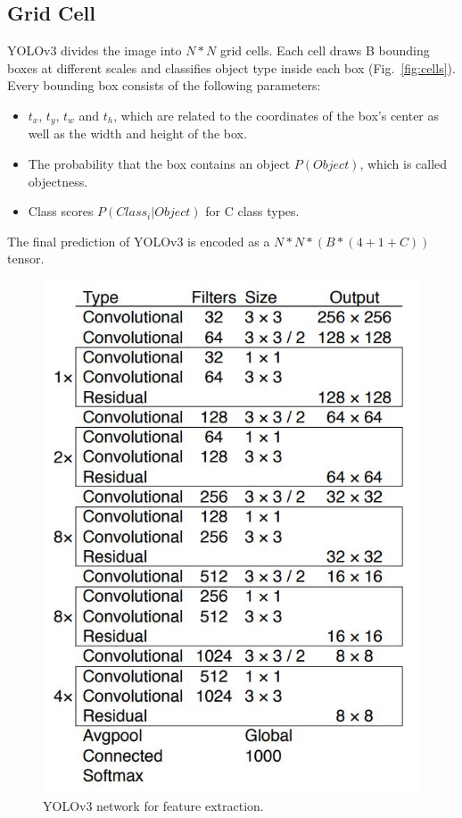 \documentclass[letterpaper]{article} %
\begin{document}
\subsection{Grid Cell}
YOLOv3 divides the image into $N*N$ grid cells. Each cell draws B bounding boxes at different scales and classifies object type inside each box (Fig.~\ref{fig:cells}). Every bounding box consists of the following parameters:
\begin{itemize}
    \item $t_x$, $t_y$, $t_w$ and $t_h$, which are related to the coordinates of the box's center as well as the width and height of the box.
    \item The probability that the box contains an object $P(Object)$, which is called objectness.
    \item Class scores $P(Class_{i}|Object)$ for C class types.
\end{itemize}
The final prediction of YOLOv3 is encoded as a $N*N*(B*(4+1+C))$ tensor.

\begin{figure}[ht]
\hspace{-8mm}
\centering
\includegraphics[width=0.85\linewidth,height = 1\linewidth]{Figure/yolov3_structure.JPG}
\caption{\footnotesize{YOLOv3 network for feature extraction.}}
\label{fig:network}
\vspace{-2mm}
\end{figure}
\end{document}

